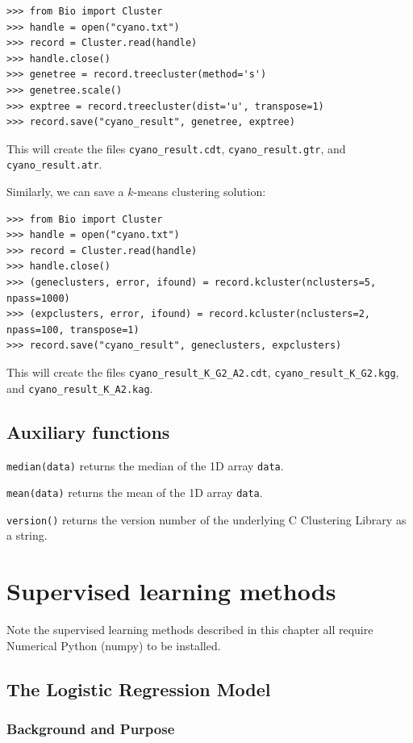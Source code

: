 \documentclass{report}
\begin{document}
\begin{verbatim}
>>> from Bio import Cluster
>>> handle = open("cyano.txt")
>>> record = Cluster.read(handle)
>>> handle.close()
>>> genetree = record.treecluster(method='s')
>>> genetree.scale()
>>> exptree = record.treecluster(dist='u', transpose=1)
>>> record.save("cyano_result", genetree, exptree)
\end{verbatim}

This will create the files \verb|cyano_result.cdt|, \verb|cyano_result.gtr|, and \verb|cyano_result.atr|.

Similarly, we can save a $k$-means clustering solution:

\begin{verbatim}
>>> from Bio import Cluster
>>> handle = open("cyano.txt")
>>> record = Cluster.read(handle)
>>> handle.close()
>>> (geneclusters, error, ifound) = record.kcluster(nclusters=5, npass=1000)
>>> (expclusters, error, ifound) = record.kcluster(nclusters=2, npass=100, transpose=1)
>>> record.save("cyano_result", geneclusters, expclusters)
\end{verbatim}

This will create the files \verb|cyano_result_K_G2_A2.cdt|, \verb|cyano_result_K_G2.kgg|, and \verb|cyano_result_K_A2.kag|.

\section{Auxiliary functions}

\verb|median(data)|
returns the median of the 1D array \verb|data|.

\verb|mean(data)|
returns the mean of the 1D array \verb|data|.

\verb|version()|
returns the version number of the underlying C Clustering Library as a string.


\chapter{Supervised learning methods}

Note the supervised learning methods described in this chapter all require Numerical Python (numpy) to be installed.

\section{The Logistic Regression Model}
\label{sec:LogisticRegression}

\subsection{Background and Purpose}
\end{document}
